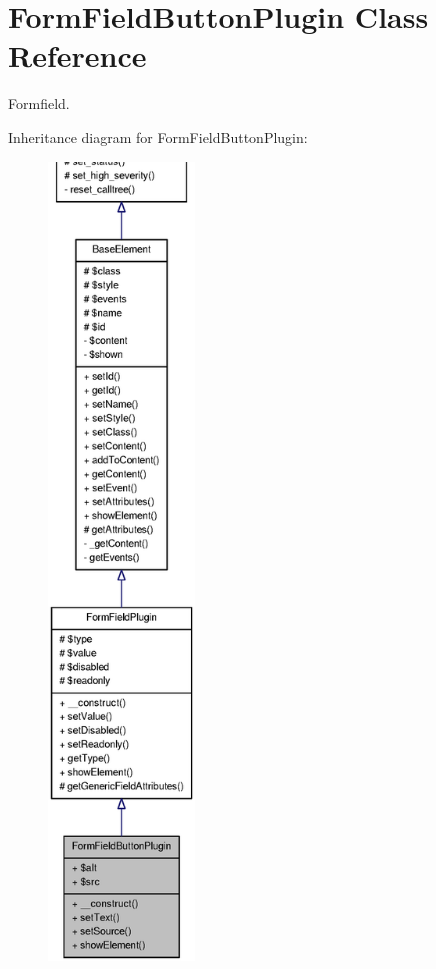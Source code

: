 \section{FormFieldButtonPlugin Class Reference}
\label{classFormFieldButtonPlugin}


Formfield.  




Inheritance diagram for FormFieldButtonPlugin:\nopagebreak
\begin{figure}[H]
\begin{center}
\leavevmode
\includegraphics[height=600pt]{classFormFieldButtonPlugin__inherit__graph}
\end{center}
\end{figure}


